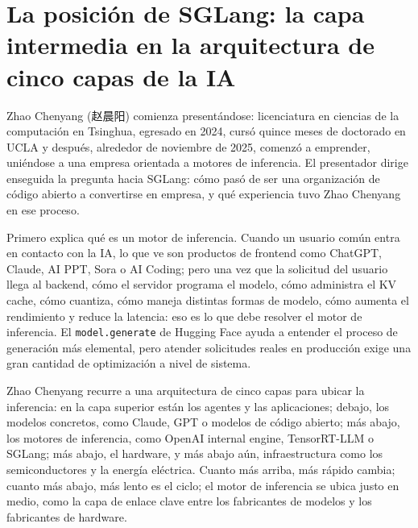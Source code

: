 \section{La posición de SGLang: la capa intermedia en la arquitectura de cinco capas de la IA}

Zhao Chenyang (赵晨阳) comienza presentándose: licenciatura en ciencias de la computación en Tsinghua, egresado en 2024, cursó quince meses de doctorado en UCLA y después, alrededor de noviembre de 2025, comenzó a emprender, uniéndose a una empresa orientada a motores de inferencia. El presentador dirige enseguida la pregunta hacia SGLang: cómo pasó de ser una organización de código abierto a convertirse en empresa, y qué experiencia tuvo Zhao Chenyang en ese proceso.

Primero explica qué es un motor de inferencia. Cuando un usuario común entra en contacto con la IA, lo que ve son productos de frontend como ChatGPT, Claude, AI PPT, Sora o AI Coding; pero una vez que la solicitud del usuario llega al backend, cómo el servidor programa el modelo, cómo administra el KV cache, cómo cuantiza, cómo maneja distintas formas de modelo, cómo aumenta el rendimiento y reduce la latencia: eso es lo que debe resolver el motor de inferencia. El \texttt{model.generate} de Hugging Face ayuda a entender el proceso de generación más elemental, pero atender solicitudes reales en producción exige una gran cantidad de optimización a nivel de sistema.

Zhao Chenyang recurre a una arquitectura de cinco capas para ubicar la inferencia: en la capa superior están los agentes y las aplicaciones; debajo, los modelos concretos, como Claude, GPT o modelos de código abierto; más abajo, los motores de inferencia, como OpenAI internal engine, TensorRT-LLM o SGLang; más abajo, el hardware, y más abajo aún, infraestructura como los semiconductores y la energía eléctrica. Cuanto más arriba, más rápido cambia; cuanto más abajo, más lento es el ciclo; el motor de inferencia se ubica justo en medio, como la capa de enlace clave entre los fabricantes de modelos y los fabricantes de hardware.

